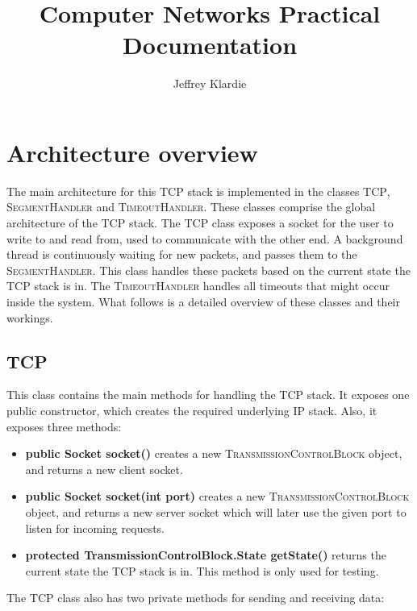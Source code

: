 \documentclass{hitec}
\title{Computer Networks Practical Documentation}
\author{Jeffrey Klardie}
\newcommand{\classname}[1]{\textsc{#1}}
\begin{document}
\maketitle

\section{Architecture overview}
The main architecture for this TCP stack is implemented in the classes \classname{TCP}, \classname{SegmentHandler} and \classname{TimeoutHandler}. These classes comprise the global architecture of the TCP stack. The \classname{TCP} class exposes a socket for the user to write to and read from, used to communicate with the other end. A background thread is continuously waiting for new packets, and passes them to the \classname{SegmentHandler}. This class handles these packets based on the current state the TCP stack is in. The \classname{TimeoutHandler} handles all timeouts that might occur inside the system. What follows is a detailed overview of these classes and their workings.

\subsection{TCP}
This class contains the main methods for handling the TCP stack. It exposes one public constructor, which creates the required underlying IP stack. Also, it exposes three methods:

\begin{itemize}
 \item \textbf{public Socket socket()} creates a new \classname{TransmissionControlBlock} object, and returns a new client socket.
 \item \textbf{public Socket socket(int port)} creates a new \classname{TransmissionControlBlock} object, and returns a new server socket which will later use the given port to listen for incoming requests.
 \item \textbf{protected TransmissionControlBlock.State getState()} returns the current state the TCP stack is in. This method is only used for testing. 
\end{itemize}

The \classname{TCP} class also has two private methods for sending and receiving data:
\end{document}
